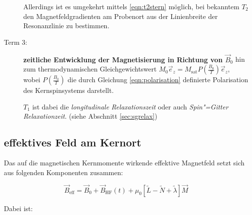 \begin{description}
		Allerdings ist es umgekehrt mittels \eqref{eqn:t2stern} möglich, bei bekanntem $T_2$ den Magnetfeldgradienten am Probenort aus der
		Linienbreite der Resonanzlinie zu bestimmen.

	\item[Term 3:] {\bfseries zeitliche Entwicklung der Magnetisierung in Richtung von $\vec B_0$}
		hin zum thermodynamischen Gleichgewichtswert
		$M_0 \vec e_z=M_\mathrm{sat}P\left(\frac{B_0}{T}\right)\vec e_z$, wobei
		$P\left(\frac{B_0}{T}\right)$ die durch Gleichung \eqref{eqn:polarisation} definierte
		Polarisation des Kernspinsystems darstellt.

		$T_1$ ist dabei die \emph{longitudinale Relaxationszeit} oder auch
		\emph{Spin"=Gitter Relaxationzeit}. (siehe Abschnitt \ref{sec:sgrelax})
\end{description}

\subsection{effektives Feld am Kernort}
\label{ssec:beff}

Das auf die magnetischen Kernmomente wirkende effektive Magnetfeld setzt sich aus folgenden
Komponenten zusammen:

\begin{equation}
	\vec B_\mathrm{eff} = \vec B_0 + \vec B_\mathrm{HF}(t) + \mu_0\left[\tilde{L} - \tilde{N} + \tilde{\lambda}\right]\vec M
\end{equation}

Dabei ist:

